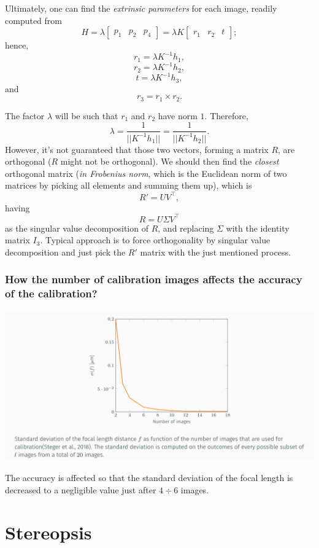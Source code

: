 \documentclass[10pt]{report}
\begin{document}
Ultimately, one can find the \emph{extrinsic parameters} for each image, readily computed from $$H = \lambda\begin{bmatrix}p_1 & p_2 & p_4\end{bmatrix} = \lambda K \begin{bmatrix} r_1 & r_2 & t\end{bmatrix};$$ hence,
$$r_1 = \lambda K^{-1}h_1,$$
$$r_2 = \lambda K^{-1}h_2,$$
$$t = \lambda K^{-1}h_3,$$ and $$r_3 = r_1 \times r_2.$$

The factor \(\lambda\) will be such that \(r_1\) and \(r_2\) have norm \(1\). Therefore, $$\lambda = \frac{1}{||K^{-1}h_1||} = \frac{1}{||K^{-1}h_2||}.$$
However, it's not guaranteed that those two vectors, forming a matrix \(R\), are orthogonal (\(R\) might not be orthogonal). We should then find the \emph{closest} orthogonal matrix (\emph{in Frobenius norm}, which is the Euclidean norm of two matrices by picking all elements and summing them up), which is \[R' = UV^\top,\] having \[R = U\Sigma V^\top \] as the singular value decomposition of \(R\), and replacing \(\Sigma\) with the identity matrix \(I_3\). Typical approach is to force orthogonality by singular value decomposition and just pick the \(R'\) matrix with the just mentioned process.

\subsection{How the number of calibration images affects the accuracy of the calibration?}
\label{sec:orgd37415f}

\begin{center}
\includegraphics[width=.9\linewidth]{./pics/cal/influence-accuracy.jpg}
\end{center}

The accuracy is affected so that the standard deviation of the focal length is decreased to a negligible value just after \(4 \div 6\) images.
\chapter{Stereopsis}
\label{sec:orgedf1120}
\end{document}
